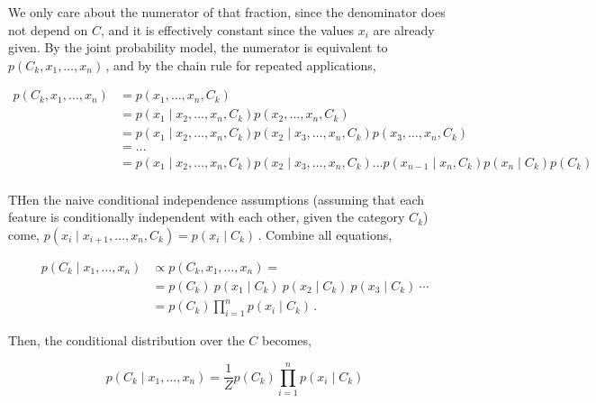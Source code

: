 \documentclass[12pt,a4paper]{article}
\begin{document}
      We only care about the numerator of that fraction, since the denominator does not depend on $C$, and it is effectively constant since the values $x_i$ are already given. By the joint probability model, the numerator is equivalent to $p(C_k, x_1, \dots, x_n)\,$, and by the chain rule for repeated applications,

      $$
        \begin{aligned}
          p(C_k, x_1, \dots, x_n) & = p(x_1, \dots, x_n, C_k)                                                                                                   \\
                                  & = p(x_1 \mid x_2, \dots, x_n, C_k) p(x_2, \dots, x_n, C_k)                                                                  \\
                                  & = p(x_1 \mid x_2, \dots, x_n, C_k) p(x_2 \mid x_3, \dots, x_n, C_k) p(x_3, \dots, x_n, C_k)                                 \\
                                  & = \dots                                                                                                                     \\
                                  & = p(x_1 \mid x_2, \dots, x_n, C_k) p(x_2 \mid x_3, \dots, x_n, C_k) \dots   p(x_{n-1} \mid x_n, C_k) p(x_n \mid C_k) p(C_k) \\
        \end{aligned}
      $$

      THen the naive conditional independence assumptions (assuming that each feature is conditionally independent with each other, given the category $C_k$) come, $p(x_i \mid x_{i+1}, \dots ,x_{n}, C_k ) = p(x_i \mid C_k)\,$. Combine all equations,

      $$
        \begin{aligned}
          p(C_k \mid x_1, \dots, x_n) & \varpropto p(C_k, x_1, \dots, x_n) =                                  \\
                                      & = p(C_k) \ p(x_1 \mid C_k) \ p(x_2\mid C_k) \ p(x_3\mid C_k) \ \cdots \\
                                      & = p(C_k) \prod_{i=1}^n p(x_i \mid C_k)\,.
        \end{aligned}
      $$

      Then, the conditional distribution over the $C$ becomes,

      \[
        p(C_k \mid x_1, \dots, x_n) = \frac{1}{Z} p(C_k) \prod_{i=1}^n p(x_i \mid C_k)
      \]
\end{document}
